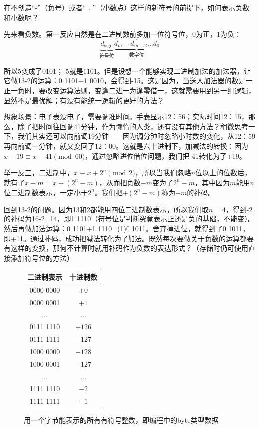 \documentclass[UTF8]{ctexart}
\begin{document}
\divider

在不创造“-”（负号）或者“ . ”（小数点）这样的新符号的前提下，如何表示负数和小数呢？

先来看负数。第一反应自然是在二进制数前多加一位符号位，0为正，1为负：
\[\underbrace{d_{\mathrm{sign}}}_{符号位}\underbrace{\overline{d_{m-1}d_{m-2}...d_0}}_{数字位}\]

所以5变成了0101；-5就是1101。但是设想一个能够实现二进制加法的加法器，让它做13-2的运算：0 1101+1 0010，会得到-15。这是因为，当送入加法器的数是一正一负时，要改变运算法则，变逢二进一为逢零借一，这就需要用到另一组逻辑，显然不是最优解；有没有能统一逻辑的更好的方法？

想象场景：电子表没电了，需要调准时间。手表显示12：56；实际时间12：15，那么，除了把时间往回调41分钟，作为懒惰的人类，还有没有其他方法？稍微思考一下，我们其实还可以向前调19分钟——因为调分钟时忽略小时数的变化，从12：59再向前调一分钟，就又变回了12：00。这就是六十进制下，加减法的转换：因为$x-19\equiv x+41\pmod{60}$，通过忽略进位借位问题，我们把-41转化为了+19。

举一反三，二进制中，$x\equiv x+2^n\pmod{2}$，所以当我们忽略$n$位以上的位数后，就有了$x-m=x+(2^n-m)$，从而把负数$-m$变为了$2^n-m$，其中因为$m$能用$n$位二进制数表示，一定小于$2^n$。我们把$+(2^n-m)$称为$-m$的补码。

回到13-2的问题。因为13和2都能用四位二进制数表示，所以我们取$n=4$，得到-2的补码为16-2=14，即1 1110（符号位是判断究竟表示正还是负的基础，不能变）。然后再做加法运算：0 1101+1 1110=(1)0 1011。舍弃掉进位，就得到了0 1011，即+11。通过补码，成功把减法转化为了加法。既然每次要做关于负数的运算都要有这样的变换，那何不计算时就用补码作为负数的表达形式？（存储时仍可使用直接添加符号位的方法）

\begin{figure}
    \begin{tabular}{|c|c|}\hline\rowcolor{lightgray}
        二进制表示 & 十进制数\\\hline
        0000 0000&$+0$\\\hline
        0000 0001&$+1$\\\hline
           ...   &...\\\hline
        0111 1110&$+126$\\\hline
        0111 1111&$+127$\\\hline
        1000 0000&$-128$\\\hline
        1000 0001&$-127$\\\hline
           ...   &...\\\hline
        1111 1110&$-2$\\\hline
        1111 1111&$-1$\\\hline
    \end{tabular}
    \caption*{用一个字节能表示的所有有符号整数，即编程中的byte类型数据}
\end{figure}
\end{document}
